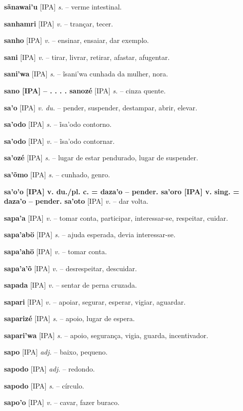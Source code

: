 {\textbf{sãnawai'u} [IPA] \textit{s.} -- verme intestinal.

\textbf{sanhamri} [IPA] \textit{v.} -- trançar, tecer.

\textbf{sanho} [IPA] \textit{v.} -- ensinar, ensaiar, dar exemplo.

\textbf{sani} [IPA] \textit{v.} -- tirar, livrar, retirar, afastar, afugentar.

\textbf{sani'wa} [IPA] \textit{s.} -- ĩsani'wa cunhada da mulher, nora.

\textbf{sano [IPA]  -- . . . . sanozé} [IPA] \textit{s.} -- cinza quente.

\textbf{sa'o} [IPA] \textit{v. du.} -- pender, suspender,  destampar, abrir, elevar.

\textbf{sa'odo} [IPA] \textit{s.} -- ĩsa'odo contorno.

\textbf{sa'odo} [IPA] \textit{v.} -- ĩsa'odo contornar.

\textbf{sa'ozé} [IPA] \textit{s.} -- lugar de estar pendurado, lugar de suspender.

\textbf{sa'õmo} [IPA] \textit{s.} -- cunhado, genro.

\textbf{sa'o'o [IPA] v. du./pl. c. = daza'o -- pender. sa'oro [IPA] v. sing. = daza'o -- pender. sa'oto} [IPA] \textit{v.} -- dar volta.

\textbf{sapa'a} [IPA] \textit{v.} -- tomar conta, participar, interessar-se, respeitar, cuidar.

\textbf{sapa'abö} [IPA] \textit{s.} -- ajuda esperada, devia interessar-se.

\textbf{sapa'ahö} [IPA] \textit{v.} -- tomar conta.

\textbf{sapa'a'õ} [IPA] \textit{v.} -- desrespeitar, descuidar.

\textbf{sapada} [IPA] \textit{v.} -- sentar de perna cruzada.

\textbf{sapari} [IPA] \textit{v.} -- apoiar, segurar, esperar, vigiar, aguardar.

\textbf{saparizé} [IPA] \textit{s.} -- apoio, lugar de espera.

\textbf{sapari'wa} [IPA] \textit{s.} -- apoio, segurança, vigia, guarda, incentivador.

\textbf{sapo} [IPA] \textit{adj.} -- baixo, pequeno.

\textbf{sapodo} [IPA] \textit{adj.} -- redondo.

\textbf{sapodo} [IPA] \textit{s.} -- círculo.

\textbf{sapo'o} [IPA] \textit{v.} -- cavar, fazer buraco. \href{https://xavante.pythonanywhere.com/static/dicionario/play.html?file=dig.wav}{\faHeadphones}

}
